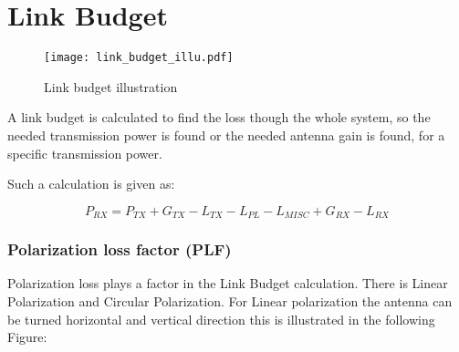 \chapter{Link Budget}

\begin{figure}[H]
\centering
\texttt{[image: link\_budget\_illu.pdf]}
\caption{Link budget illustration}
\label{dijdkkfkf}
\end{figure}







A link budget is calculated to find the loss though the whole system, so the needed transmission power is found or the needed antenna gain is found, for a specific transmission power.

Such a calculation is given as:

\begin{equation}
P_{RX} = P_{TX} + G_{TX} - L_{TX} - L_{PL} - L_{MISC} + G_{RX} - L_{RX}
\label{link_calc}
\end{equation}

\begin{where}
\end{where}
\newpage
\subsection{Polarization loss factor (PLF)}
Polarization loss plays a factor in the Link Budget calculation. There is Linear Polarization and Circular Polarization. For Linear polarization the antenna can be turned horizontal and vertical direction this is illustrated in the following Figure:

